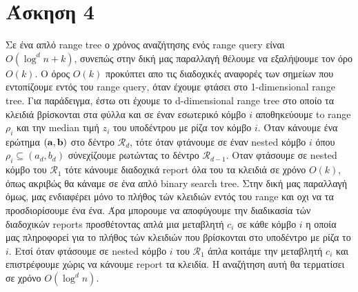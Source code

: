 \documentclass[12pt]{article}
\begin{document}
\section*{Άσκηση 4}
Σε ένα απλό \textlatin{range tree} ο χρόνος αναζήτησης ενός \textlatin{range query} είναι $Ο(\log^d n +k)$, συνεπώς στην δική μας παραλλαγή θέλουμε να εξαλήψουμε τον όρο $O(k)$. O όρος $O(k)$
προκύπτει απο τις διαδοχικές αναφορές των σημείων που εντοπίζουμε εντός του \textlatin{range query}, όταν έχουμε φτάσει στο \textlatin{1-dimensional range tree}. Για παράδειγμα, έστω οτι έχουμε το 
\textlatin{d-dimensional range tree} στο οποίο τα κλειδιά βρίσκονται στα φύλλα και σε έναν εσωτερικό κόμβο $i$ αποθηκεύουμε to \textlatin{range} $\rho_i$ και την \textlatin{median} τιμή $z_i$ του υποδέντρου με ρίζα τον κόμβο $i$. 
Όταν κάνουμε ένα ερώτημα $\bf (a,b)$ στο δέντρο $\mathcal{R}_d$, τότε όταν φτάνουμε σε έναν \textlatin{nested} κόμβο $i$ όπου $\rho_i \subseteq (a_d,b_d)$ σύνεχίζουμε ρωτώντας το δέντρο $\mathcal{R}_{d-1}$. Οταν φτάσουμε σε \textlatin{nested} κόμβο του  $\mathcal{R}_{1}$ τότε κάνουμε διαδοχικά \textlatin{report} 
όλα του τα κλειδιά σε χρόνο $O(k)$, όπως ακριβώς θα κάναμε σε ένα απλό \textlatin{binary search tree}. Στην δική μας παραλλαγή όμως, μας ενδιαφέρει μόνο το πλήθος τών κλειδιών εντός του \textlatin{range} και οχι να τα προσδιορίσουμε ένα ένα. Άρα μπορουμε να αποφύγουμε την διαδικασία τών διαδοχικών \textlatin{reports} προσθέτοντας απλά μια μεταβλητή 
$c_i$ σε κάθε κόμβο $i$ η οποία μας πληροφορεί για το πλήθος τών κλειδιών που βρίσκονται στο υποδέντρο με ρίζα το $i$. Ετσί όταν φτάσουμε σε \textlatin{nested} κόμβο $i$ του   $\mathcal{R}_{1}$ άπλα κοιτάμε την μεταβλητή $c_i$ και επιστρέφουμε χώρις να κάνουμε \textlatin{report} τα κλειδία.
Η  αναζήτηση αυτή θα τερματίσει σε χρόνο $Ο(\log^d n)$. \\
\end{document}
